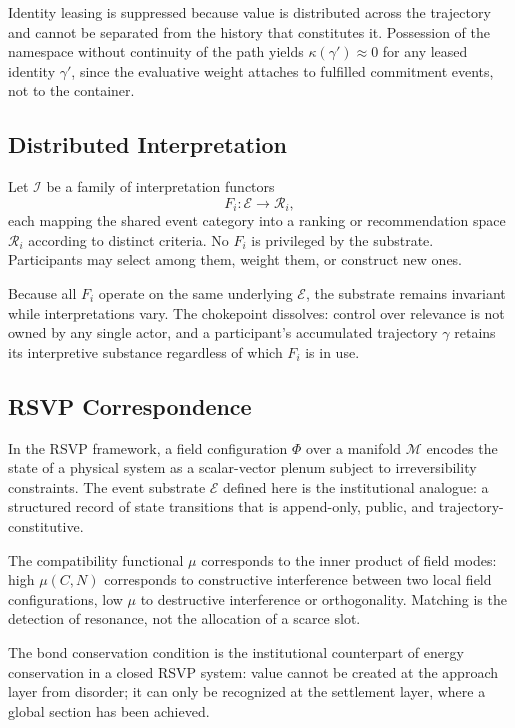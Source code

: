 \documentclass[12pt, a4paper]{article}
\begin{document}
Identity leasing is suppressed because value is distributed across the
trajectory and cannot be separated from the history that constitutes it.
Possession of the namespace without continuity of the path yields
$\kappa(\gamma') \approx 0$ for any leased identity $\gamma'$, since the
evaluative weight attaches to fulfilled commitment events, not to the container.

\subsection{Distributed Interpretation}

Let $\mathcal{I}$ be a family of interpretation functors
\[
F_i : \mathcal{E} \to \mathcal{R}_i,
\]
each mapping the shared event category into a ranking or recommendation space
$\mathcal{R}_i$ according to distinct criteria. No $F_i$ is privileged by
the substrate. Participants may select among them, weight them, or construct
new ones.

Because all $F_i$ operate on the same underlying $\mathcal{E}$, the substrate
remains invariant while interpretations vary. The chokepoint dissolves: control
over relevance is not owned by any single actor, and a participant's accumulated
trajectory $\gamma$ retains its interpretive substance regardless of which
$F_i$ is in use.

\subsection{RSVP Correspondence}

In the RSVP framework, a field configuration $\Phi$ over a manifold $\mathcal{M}$
encodes the state of a physical system as a scalar-vector plenum subject to
irreversibility constraints. The event substrate $\mathcal{E}$ defined here is
the institutional analogue: a structured record of state transitions that is
append-only, public, and trajectory-constitutive.

The compatibility functional $\mu$ corresponds to the inner product of field
modes: high $\mu(C, N)$ corresponds to constructive interference between
two local field configurations, low $\mu$ to destructive interference or
orthogonality. Matching is the detection of resonance, not the allocation of
a scarce slot.

The bond conservation condition is the institutional counterpart of energy
conservation in a closed RSVP system: value cannot be created at the approach
layer from disorder; it can only be recognized at the settlement layer, where
a global section has been achieved.
\end{document}

